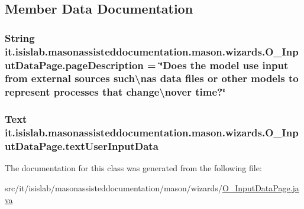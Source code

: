 \subsection{Member Data Documentation}
\hypertarget{classit_1_1isislab_1_1masonassisteddocumentation_1_1mason_1_1wizards_1_1_o___input_data_page_a392593dd5fd3ca9cf1ff07ab170a884e}{
\subsubsection[{page\-Description}]{\setlength{\rightskip}{0pt plus 5cm}String it.\-isislab.\-masonassisteddocumentation.\-mason.\-wizards.\-O\-\_\-\-Input\-Data\-Page.\-page\-Description = \char`\"{}Does the model use input from external sources such\textbackslash{}nas data files or other models to represent processes that change\textbackslash{}nover time?\char`\"{}\hspace{0.3cm}{\ttfamily [private]}}}\label{classit_1_1isislab_1_1masonassisteddocumentation_1_1mason_1_1wizards_1_1_o___input_data_page_a392593dd5fd3ca9cf1ff07ab170a884e}
\hypertarget{classit_1_1isislab_1_1masonassisteddocumentation_1_1mason_1_1wizards_1_1_o___input_data_page_add92b759816c704809eed977d5b343c5}{
\subsubsection[{text\-User\-Input\-Data}]{\setlength{\rightskip}{0pt plus 5cm}Text it.\-isislab.\-masonassisteddocumentation.\-mason.\-wizards.\-O\-\_\-\-Input\-Data\-Page.\-text\-User\-Input\-Data\hspace{0.3cm}{\ttfamily [private]}}}\label{classit_1_1isislab_1_1masonassisteddocumentation_1_1mason_1_1wizards_1_1_o___input_data_page_add92b759816c704809eed977d5b343c5}


The documentation for this class was generated from the following file\-:\begin{DoxyCompactItemize}
\item 
src/it/isislab/masonassisteddocumentation/mason/wizards/\hyperlink{_o___input_data_page_8java}{O\-\_\-\-Input\-Data\-Page.\-java}\end{DoxyCompactItemize}
